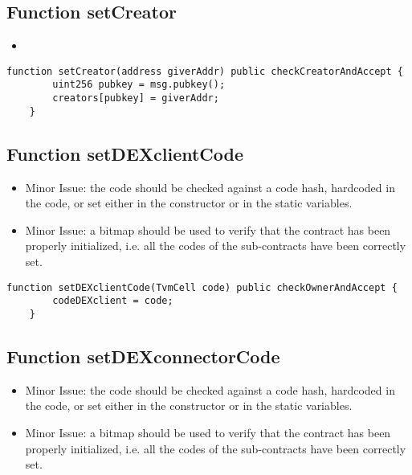 \subsection{Function setCreator}

\begin{itemize}
\item {}
\end{itemize}

\begin{lstlisting}[firstnumber=100]
	function setCreator(address giverAddr) public checkCreatorAndAccept {
		uint256 pubkey = msg.pubkey();
		creators[pubkey] = giverAddr;
	}
\end{lstlisting}

\subsection{Function setDEXclientCode}

\begin{itemize}
\item Minor Issue: the code should be checked against a code hash,
  hardcoded in the code, or set either in the constructor or in the
  static variables.
\item Minor Issue: a bitmap should be used to verify that the contract
  has been properly initialized, i.e. all the codes of the
  sub-contracts have been correctly set.
\end{itemize}

\begin{lstlisting}[firstnumber=80]
	function setDEXclientCode(TvmCell code) public checkOwnerAndAccept {
		codeDEXclient = code;
	}
\end{lstlisting}

\subsection{Function setDEXconnectorCode}


\begin{itemize}
\item Minor Issue: the code should be checked against a code hash,
  hardcoded in the code, or set either in the constructor or in the
  static variables.
\item Minor Issue: a bitmap should be used to verify that the contract
  has been properly initialized, i.e. all the codes of the
  sub-contracts have been correctly set.
\end{itemize}

